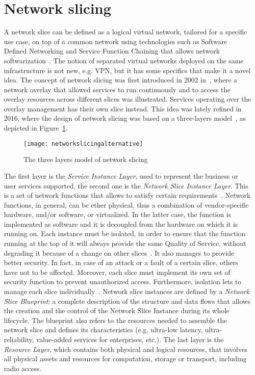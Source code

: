 \section{Network slicing}
A network slice can be defined as a logical virtual network, tailored for a
specific use case, on top of a common network using technologies such as
Software Defined Networking and Service Function Chaining that allows network
softwarization~\cite{ordonez2017network}. The notion of separated virtual
networks deployed on the same infrastructure is not new, e.g. VPN, but it has
some specifics that make it a novel idea. The concept of network slicing was
first introduced in 2002 in~\cite{peterson2003blueprint}, where a network 
overlay that allowed services to run continuously and to access the overlay
resources across different slices was illustrated.
Services operating over the overlay management has their own slice instead.
This idea was lately refined in 2016, where the design of network slicing was
based on a three-layers model~\cite{alliance2016description}, as depicted in 
Figure~\ref{chap:background:img:network_slicing}.

\begin{figure}[t]
  \centering
  \texttt{[image: networkslicingalternative]}
  \caption[The three layers model of network slicing]{The three layers model of
    network slicing~\cite{kim20173gpp}}
  \label{chap:background:img:network_slicing}
\end{figure}

The first layer is the \emph{Service Instance Layer}, used to represent the
business or user services supported, the second one is the \emph{Network Slice
Instance Layer}. This is a set of network functions that allows to
satisfy certain requirements~\cite{kotulski2017end}. Network functions, in
general, can be ether physical, thus a combination of vendor-specific hardware,
and/or software, or virtualized. In the latter case, the function is implemented
as software and it is decoupled from the hardware on which it is running on.
Each instance must be isolated, in order to ensure that the function running at
the top of it will always provide the same Quality of Service, without degrading
it because of a change on other slices~\cite{richart2016resource}. It also
manages to provide better security. In fact, in case of an attack or a fault of
a certain slice, others have not to be affected. Moreover, each slice must
implement its own set of security function to prevent unauthorized access.
Furthermore, isolation lets to manage each slice
individually~\cite{ordonez2017network}. Network slice instances are defined by
a \emph{Network Slice Blueprint}: a complete description of the structure and
data flows that allows the creation and the control of the Network Slice
Instance during its whole lifecycle. The blueprint also refers to the resources
needed to assemble the network slice and defines its characteristics (e.g.
ultra-low latency, ultra-reliability, value-added services for enterprises,
etc.). The last layer is the \emph{Resource Layer}, which contains both physical
and logical resources, that involves all physical assets and resources for
computation, storage or transport, including radio access.

